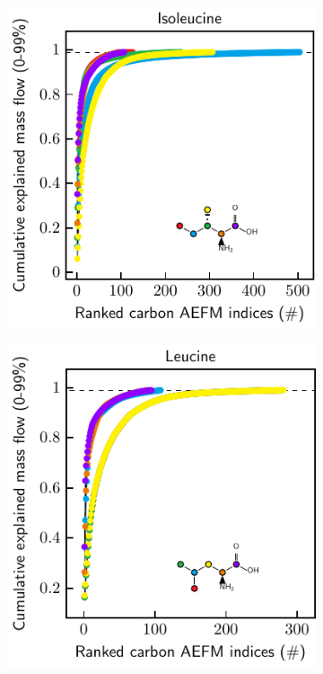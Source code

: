\documentclass[]{article}
\begin{document}
\begin{figure}
\begin{subfigure}[t]{0.247\textwidth}
    \end{subfigure}
    \begin{subfigure}[t]{0.247\textwidth}
        \caption{}
        \includegraphics[width=\textwidth]{subpanels/cumulative-source-met-20-legend.pdf}\\
    \end{subfigure}
    \begin{subfigure}[t]{0.247\textwidth}
        \caption{}
        \includegraphics[width=\textwidth]{subpanels/cumulative-source-met-21-legend.pdf}\\
    \end{subfigure}


\end{figure}
\end{document}
